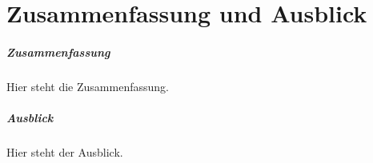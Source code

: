 \chapter{Zusammenfassung und Ausblick}

\paragraph{Zusammenfassung}
Hier steht die Zusammenfassung.

\paragraph{Ausblick}
Hier steht der Ausblick.